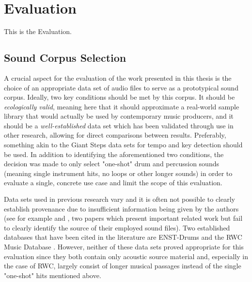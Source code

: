 
\section{Evaluation}
\label{sec:evaluation}
This is the Evaluation.

\subsection{Sound Corpus Selection}
\label{subsec:eval_corpus_selection}
A crucial aspect for the evaluation of the work presented in this thesis is the
choice of an appropriate data set of audio files to serve as a prototypical
sound corpus. Ideally, two key conditions should be met by this corpus. It
should be \textit{ecologically valid}, meaning here that it should approximate a
real-world sample library that would actually be used by contemporary music
producers, and it should be a \textit{well-established} data set which has been
validated through use in other research, allowing for direct comparisons between
results. Preferably, something akin to the Giant Steps data sets
\citep{knees2015} for tempo and key detection should be used.
In addition to identifying the aforementioned two conditions, the decision was
made to only select "one-shot" drum and percussion sounds (meaning single
instrument hits, no loops or other longer sounds) in order to evaluate a single,
concrete use case and limit the scope of this evaluation.

\smallskip

Data sets used in previous research vary and it is often not possible to clearly
establish provenance due to insufficient information being given by the authors
(see for example \citet{fried2014} and \citet{shier2017}, two papers which
present important related work but fail to clearly identify the source of their
employed sound files). Two established databases that have been cited in the
literature are ENST-Drums \citep{gillet2006} and the RWC Music Database
\citep{goto2002}. However, neither of these data sets proved appropriate for
this evaluation since they both contain only acoustic source material and,
especially in the case of RWC, largely consist of longer musical passages
instead of the single "one-shot" hits mentioned above.

\smallskip

